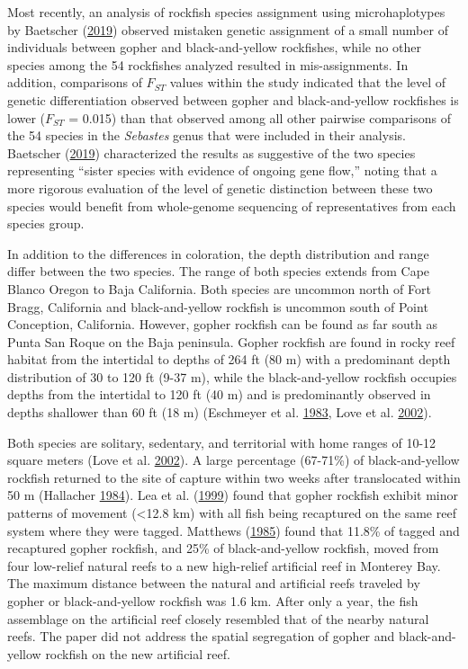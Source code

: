 \documentclass[12pt,]{article}
\begin{document}
Most recently, an analysis of rockfish species assignment using
microhaplotypes by Baetscher
(\protect\hyperlink{ref-Baetscher2019}{2019}) observed mistaken genetic
assignment of a small number of individuals between gopher and
black-and-yellow rockfishes, while no other species among the 54
rockfishes analyzed resulted in mis-assignments. In addition,
comparisons of \(F_{ST}\) values within the study indicated that the
level of genetic differentiation observed between gopher and
black-and-yellow rockfishes is lower (\(F_{ST}\) = 0.015) than that
observed among all other pairwise comparisons of the 54 species in the
\emph{Sebastes} genus that were included in their analysis. Baetscher
(\protect\hyperlink{ref-Baetscher2019}{2019}) characterized the results
as suggestive of the two species representing ``sister species with
evidence of ongoing gene flow,'' noting that a more rigorous evaluation
of the level of genetic distinction between these two species would
benefit from whole-genome sequencing of representatives from each
species group.

In addition to the differences in coloration, the depth distribution and
range differ between the two species. The range of both species extends
from Cape Blanco Oregon to Baja California. Both species are uncommon
north of Fort Bragg, California and black-and-yellow rockfish is
uncommon south of Point Conception, California. However, gopher rockfish
can be found as far south as Punta San Roque on the Baja peninsula.
Gopher rockfish are found in rocky reef habitat from the intertidal to
depths of 264 ft (80 m) with a predominant depth distribution of 30 to
120 ft (9-37 m), while the black-and-yellow rockfish occupies depths
from the intertidal to 120 ft (40 m) and is predominantly observed in
depths shallower than 60 ft (18 m) (Eschmeyer et al.
\protect\hyperlink{ref-Eschmeyer1983}{1983}, Love et al.
\protect\hyperlink{ref-Love2002}{2002}).

Both species are solitary, sedentary, and territorial with home ranges
of 10-12 square meters (Love et al.
\protect\hyperlink{ref-Love2002}{2002}). A large percentage (67-71\%) of
black-and-yellow rockfish returned to the site of capture within two
weeks after translocated within 50 m (Hallacher
\protect\hyperlink{ref-Hallacher1984}{1984}). Lea et al.
(\protect\hyperlink{ref-Lea1999}{1999}) found that gopher rockfish
exhibit minor patterns of movement (\textless{}12.8 km) with all fish
being recaptured on the same reef system where they were tagged.
Matthews (\protect\hyperlink{ref-Matthews1985}{1985}) found that 11.8\%
of tagged and recaptured gopher rockfish, and 25\% of black-and-yellow
rockfish, moved from four low-relief natural reefs to a new high-relief
artificial reef in Monterey Bay. The maximum distance between the
natural and artificial reefs traveled by gopher or black-and-yellow
rockfish was 1.6 km. After only a year, the fish assemblage on the
artificial reef closely resembled that of the nearby natural reefs. The
paper did not address the spatial segregation of gopher and
black-and-yellow rockfish on the new artificial reef.
\end{document}
